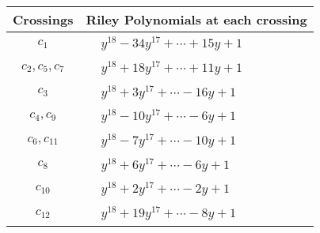 \documentclass[1p]{elsarticle_modified}
\theoremstyle{definition}
\begin{document}
\begin{tabular}{m{50pt}|m{274pt}}
Crossings & \hspace{64pt}Riley Polynomials at each crossing \\
\hline $$\begin{aligned}c_{1}\end{aligned}$$&$\begin{aligned}
&y^{18}-34 y^{17}+\cdots+15 y+1
\end{aligned}$\\
\hline $$\begin{aligned}c_{2},c_{5},c_{7}\end{aligned}$$&$\begin{aligned}
&y^{18}+18 y^{17}+\cdots+11 y+1
\end{aligned}$\\
\hline $$\begin{aligned}c_{3}\end{aligned}$$&$\begin{aligned}
&y^{18}+3 y^{17}+\cdots-16 y+1
\end{aligned}$\\
\hline $$\begin{aligned}c_{4},c_{9}\end{aligned}$$&$\begin{aligned}
&y^{18}-10 y^{17}+\cdots-6 y+1
\end{aligned}$\\
\hline $$\begin{aligned}c_{6},c_{11}\end{aligned}$$&$\begin{aligned}
&y^{18}-7 y^{17}+\cdots-10 y+1
\end{aligned}$\\
\hline $$\begin{aligned}c_{8}\end{aligned}$$&$\begin{aligned}
&y^{18}+6 y^{17}+\cdots-6 y+1
\end{aligned}$\\
\hline $$\begin{aligned}c_{10}\end{aligned}$$&$\begin{aligned}
&y^{18}+2 y^{17}+\cdots-2 y+1
\end{aligned}$\\
\hline $$\begin{aligned}c_{12}\end{aligned}$$&$\begin{aligned}
&y^{18}+19 y^{17}+\cdots-8 y+1
\end{aligned}$\\
\hline
\end{tabular}\\~\\
\end{document}
